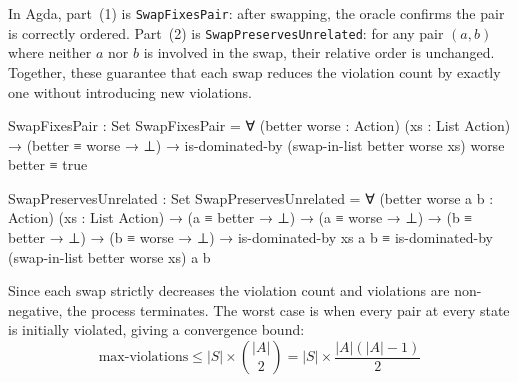 \documentclass[9pt,a4paper]{article}
\theoremstyle{plain}
\theoremstyle{definition}
\theoremstyle{remark}
\begin{document}
\noindent In Agda, part~(1) is \texttt{SwapFixesPair}: after swapping, the oracle confirms the pair is correctly ordered.  Part~(2) is \texttt{SwapPreservesUnrelated}: for any pair $(a, b)$ where neither $a$ nor $b$ is involved in the swap, their relative order is unchanged.  Together, these guarantee that each swap reduces the violation count by exactly one without introducing new violations.

\begin{code}
  SwapFixesPair : Set
  SwapFixesPair = ∀ (better worse : Action) (xs : List Action) →
    (better ≡ worse → ⊥) →
    is-dominated-by (swap-in-list better worse xs) worse better ≡ true

  SwapPreservesUnrelated : Set
  SwapPreservesUnrelated = ∀ (better worse a b : Action) (xs : List Action) →
    (a ≡ better → ⊥) → (a ≡ worse → ⊥) →
    (b ≡ better → ⊥) → (b ≡ worse → ⊥) →
    is-dominated-by xs a b ≡ is-dominated-by (swap-in-list better worse xs) a b
\end{code}

\noindent Since each swap strictly decreases the violation count and violations are non-negative, the process terminates.  The worst case is when every pair at every state is initially violated, giving a convergence bound:
\[
\text{max-violations} \leq |S| \times \binom{|A|}{2} = |S| \times \frac{|A|(|A|-1)}{2}
\]
\end{document}
